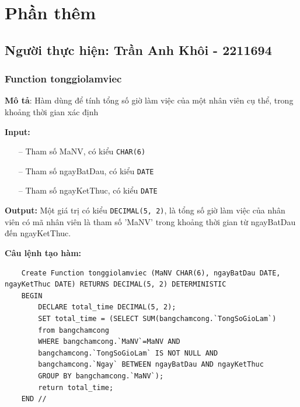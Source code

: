 \section{Phần thêm}
\subsection{Người thực hiện: Trần Anh Khôi - 2211694}
\subsubsection{Function tonggiolamviec}
\textbf{Mô tả}: Hàm dùng để tính tổng số giờ làm việc của một nhân viên cụ thể, trong khoảng thời gian xác định

\textbf{Input:}
\begin{itemize}
    \item [--] Tham số MaNV, có kiểu \texttt{CHAR(6)}
    \item [--] Tham số ngayBatDau, có kiểu \texttt{DATE}
    \item [--] Tham số ngayKetThuc, có kiểu \texttt{DATE}
\end{itemize}

\textbf{Output:} Một giá trị có kiểu \texttt{DECIMAL(5, 2)}, là tổng số giờ làm việc của nhân viên có mã nhân viên là tham số 'MaNV' trong khoảng thời gian từ ngayBatDau đến ngayKetThuc.

\textbf{Câu lệnh tạo hàm:} 
\begin{verbatim}
    Create Function tonggiolamviec (MaNV CHAR(6), ngayBatDau DATE, ngayKetThuc DATE) RETURNS DECIMAL(5, 2) DETERMINISTIC
    BEGIN
        DECLARE total_time DECIMAL(5, 2);
        SET total_time = (SELECT SUM(bangchamcong.`TongSoGioLam`)
        from bangchamcong 
        WHERE bangchamcong.`MaNV`=MaNV AND 
        bangchamcong.`TongSoGioLam` IS NOT NULL AND
        bangchamcong.`Ngay` BETWEEN ngayBatDau AND ngayKetThuc
        GROUP BY bangchamcong.`MaNV`);
        return total_time;
    END //
\end{verbatim}


